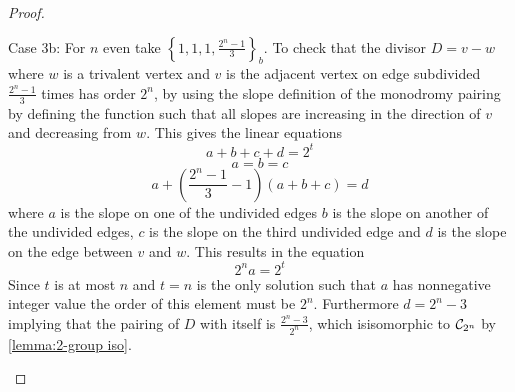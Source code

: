 \documentclass{amsart}
\begin{document}
\begin{proof}
\begin{center}
\end{center}
    
    Case 3b: For $n$ even take $\left\{1,1,1,
\frac{2^{n}-1}{3}\right\}_{b}$. To check that the divisor
$D=v-w$ where $w$ is a trivalent vertex and $v$ is the adjacent vertex
on edge subdivided $\frac{2^{n}-1}{3}$ times  has order $2^{n}$, by using the slope
definition of the monodromy pairing by defining the function such that all slopes are increasing in the direction of $v$ and decreasing from $w$.  This gives the linear equations 
\begin{equation*}
a+b+c+d=2^{t}
\end{equation*}
\begin{equation*}
a=b=c
\end{equation*}
\begin{equation*}
a+\left(\frac{2^{n}-1}{3}-1 \right)(a+b+c)=d
\end{equation*}
where $a$ is the slope on one of the undivided edges
$b$ is the slope on another of the undivided edges,  $c$ is the
slope on the third undivided edge and $d$ is the slope on
the edge between $v$ and $w$.
This results in the equation 
\begin{equation*}
2^na=2^t
\end{equation*}
Since $t$ is at most $n$ and $t=n$ is the only solution such that $a$ has nonnegative  integer value the order of this element must be $2^{n}$. Furthermore $d=2^{n}-3$ implying that the pairing of $D$ with itself is $\frac{2^{n}-3}{2^{n}}$, which isisomorphic to $\mathcal{C}_{2^{n}}$ by  \ref{lemma:2-group iso}.

\begin{center}
\end{center}
\end{proof}
\end{document}
